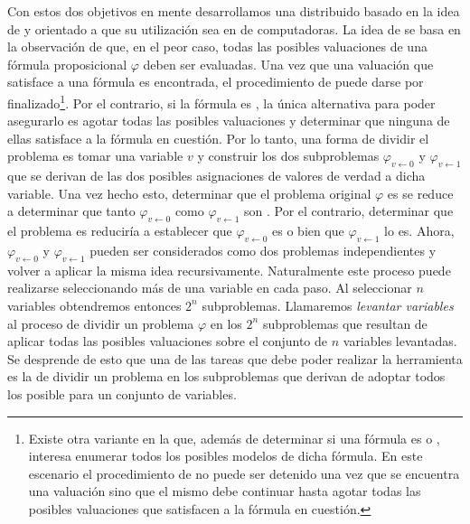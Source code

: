 Con estos dos objetivos en mente desarrollamos una \ssolver distribuido basado
en la idea de \gp y orientado a que su utilización sea en \clusters de computadoras. La idea de \gp se
basa en la observación de que, en el peor caso, todas las posibles valuaciones
de una fórmula proposicional $\varphi$ deben ser evaluadas. Una vez que una
valuación que satisface a una fórmula es encontrada, el procedimiento de
\ssolving puede darse por finalizado\footnote{Existe otra variante en la que, además
de determinar si una fórmula es \sat o \unsat, interesa enumerar todos los
posibles modelos de dicha fórmula. En este escenario el procedimiento de
\ssolving no puede ser detenido una vez que se encuentra una valuación sino
que el mismo debe continuar hasta agotar todas las posibles valuaciones que
satisfacen a la fórmula en cuestión.}. Por el contrario, si la fórmula es
\unsat, la única alternativa para poder asegurarlo es agotar todas las
posibles valuaciones y determinar que ninguna de ellas satisface a la fórmula
en cuestión. Por lo tanto, una forma de dividir el problema es tomar una
variable $v$ y construir los dos subproblemas $\varphi_{v \leftarrow 0}$ y
$\varphi_{v \leftarrow 1}$ que se derivan de las dos posibles asignaciones de
valores de verdad a dicha variable. Una vez hecho esto, determinar que el
problema original $\varphi$ es \unsat se reduce a determinar que tanto
$\varphi_{v \leftarrow 0}$ como $\varphi_{v \leftarrow 1}$ son \unsat. Por el
contrario, determinar que el problema es \sat reduciría a establecer que
$\varphi_{v \leftarrow 0}$ es \sat o bien que $\varphi_{v \leftarrow 1}$ lo
es. Ahora, $\varphi_{v \leftarrow 0}$ y $\varphi_{v \leftarrow 1}$ pueden ser
considerados como dos problemas independientes y volver a aplicar la misma
idea recursivamente. Naturalmente este proceso puede realizarse seleccionando
más de una variable en cada paso. Al seleccionar $n$ variables obtendremos
entonces $2^n$ subproblemas. Llamaremos \emph{levantar variables} al proceso
de dividir un problema $\varphi$ en los $2^n$ subproblemas que resultan de
aplicar todas las posibles valuaciones sobre el conjunto de $n$ variables
levantadas. Se desprende de esto que una de las tareas que debe poder realizar
la herramienta es la de dividir un problema en los subproblemas que derivan de 
adoptar todos los posible \gp para un conjunto de variables.


